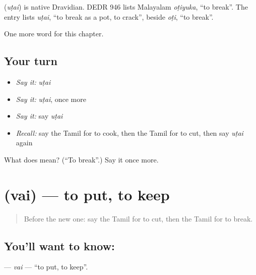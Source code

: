 \begin{cousinweb}
\textbf{} (\emph{uṭai}) is native Dravidian. DEDR 946 lists Malayalam \emph{oṭiyuka}, \textquotedblleft{}to break\textquotedblright{}. The entry lists \emph{uṭai}, \textquotedblleft{}to break as a pot, to crack\textquotedblright{}, beside \emph{oṭi}, \textquotedblleft{}to break\textquotedblright{}.
\end{cousinweb}

\begin{grammarlens}[title={What you've built}]
One more word for this chapter.
\end{grammarlens}

\subsection*{Your turn}
\begin{itemize}
\raggedright
  \item \emph{Say it:} \emph{uṭai}
  \item \emph{Say it:} \emph{uṭai}, once more
  \item \emph{Say it:} say \emph{uṭai}
  \item \emph{Recall:} say the Tamil for to cook, then the Tamil for to cut, then say \emph{uṭai} again
\end{itemize}

\begin{tcolorbox}[breakable,colback=teal!4,colframe=teal!35!black,title={Before you move on}]
What does  mean? (\textquotedblleft{}To break\textquotedblright{}.) Say it once more.
\end{tcolorbox}
\section[\texorpdfstring{\ta{வை} (vai)}{வை (vai)}]{ (vai) — to put, to keep}

\label{lesson:TA-C151-vai}



\begin{quote}
Before the new one: say the Tamil for to cut, then the Tamil for to break.
\end{quote}

\subsection*{You'll want to know: }
\textbf{} — \emph{vai} — \textquotedblleft{}to put, to keep\textquotedblright{}.

